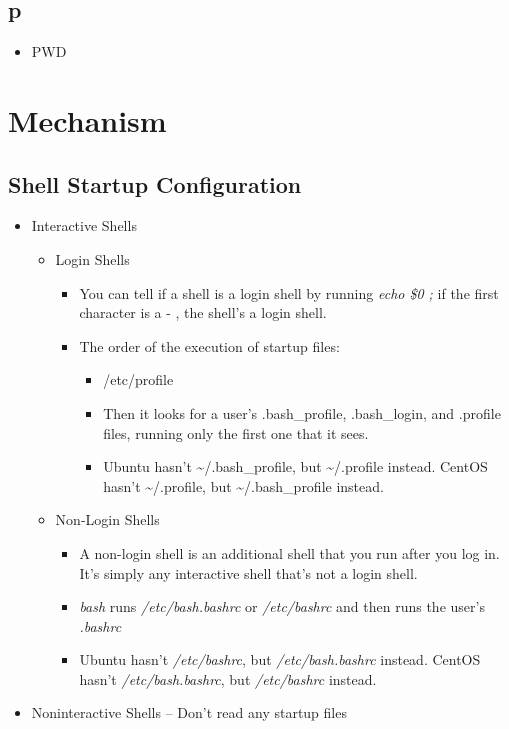 \documentclass[titlepage]{article}
\begin{document}
      \subsection{p}
        \begin{itemize}
        	\item PWD
        \end{itemize}
    
    \section{Mechanism}
      \subsection{Shell Startup Configuration}
        \begin{itemize}
        	\item Interactive Shells
        	  \begin{itemize}
        	  	\item Login Shells
        	  	  \begin{itemize}
        	  	  	\item You can tell if a shell is a login shell by running \emph{echo \$0 ;} if the first character is a - , the shell’s a login shell.
        	  	  	\item The order of the execution of startup files:
        	  	  	  \begin{itemize}
        	  	  	  	\item /etc/profile
        	  	  	  	\item Then it looks for a user’s .bash\_profile, .bash\_login, and .profile files, running only the first one that it sees.
        	  	  	  	\item Ubuntu hasn't \textasciitilde/.bash\_profile, but \textasciitilde/.profile instead. CentOS hasn't \textasciitilde/.profile, but \textasciitilde/.bash\_profile instead.
        	  	  	  \end{itemize}
        	  	  \end{itemize}
          	    \item Non-Login Shells
          	      \begin{itemize}
          	      	\item A non-login shell is an additional shell that you run after you log in. It’s
          	      	simply any interactive shell that’s not a login shell.
          	      	\item \emph{bash} runs \emph{/etc/bash.bashrc} or \emph{/etc/bashrc} and then runs the user’s \emph{.bashrc}
          	      	\item Ubuntu hasn't \emph{/etc/bashrc}, but \emph{/etc/bash.bashrc} instead. CentOS hasn't \emph{/etc/bash.bashrc}, but \emph{/etc/bashrc} instead.
          	      \end{itemize}
        	  \end{itemize}
        	\item Noninteractive Shells -- Don't read any startup files
        \end{itemize}
    
\end{document}
